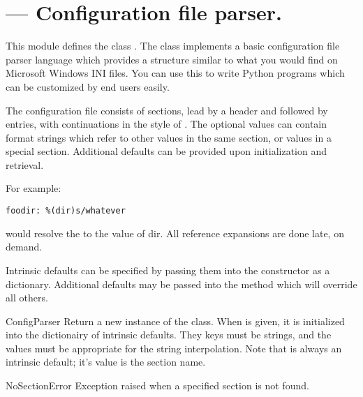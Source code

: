 \section{ ---
         Configuration file parser.}



This module defines the class . The
 class implements a basic configuration file
parser language which provides a structure similar to what you would
find on Microsoft Windows INI files.  You can use this to write Python 
programs which can be customized by end users easily.

The configuration file consists of sections, lead by a
\samp{[section]} header and followed by  entries,
with continuations in the style of .  The optional values 
can contain format strings which refer to other values in the same
section, or values in a special  section.  Additional
defaults can be provided upon initialization and retrieval.

For example:

\begin{verbatim}
foodir: %(dir)s/whatever
\end{verbatim}

would resolve the  to the value of dir. All reference
expansions are done late, on demand.

Intrinsic defaults can be specified by passing them into the
 constructor as a dictionary.  Additional defaults
may be passed into the  method which will override all
others.

\begin{classdesc}{ConfigParser}{}
Return a new instance of the  class.  When
 is given, it is initialized into the dictionairy of
intrinsic defaults.  They keys must be strings, and the values must be 
appropriate for the  string interpolation.  Note that
 is always an intrinsic default; it's value is the 
section name.
\end{classdesc}

\begin{excdesc}{NoSectionError}
Exception raised when a specified section is not found.
\end{excdesc}

